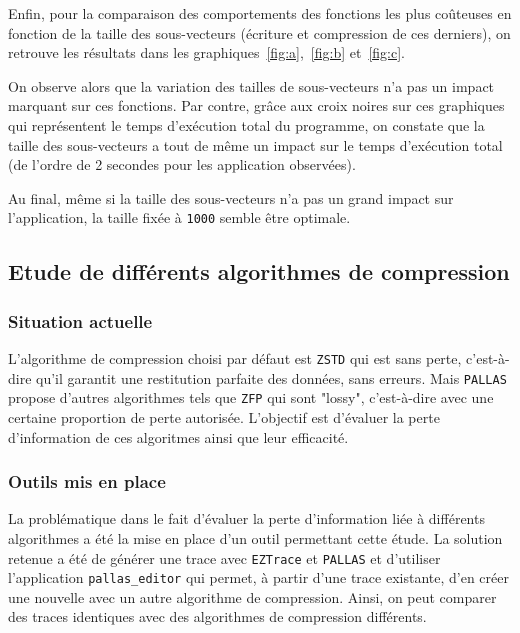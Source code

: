 Enfin, pour la comparaison des comportements des fonctions les plus coûteuses en fonction de la taille des sous-vecteurs (écriture et compression de ces derniers),
on retrouve les résultats dans les graphiques~\ref{fig:a},~\ref{fig:b} et~\ref{fig:c}.

On observe alors que la variation des tailles de sous-vecteurs n'a pas un impact marquant sur ces fonctions. Par contre, grâce aux croix noires sur ces graphiques qui représentent le temps d'exécution total du programme,
on constate que la taille des sous-vecteurs a tout de même un impact sur le temps d'exécution total (de l'ordre de 2 secondes pour les application observées).

Au final, même si la taille des sous-vecteurs n'a pas un grand impact sur l'application, la taille fixée à \verb!1000! semble être optimale.


\clearpage


\subsection{Etude de différents algorithmes de compression}\label{ssec:comp}
\subsubsection{Situation actuelle}\label{ssec:comp_situ}

L'algorithme de compression choisi par défaut est \verb!ZSTD! qui est sans perte, c'est-à-dire qu'il garantit une restitution parfaite des données, sans erreurs.
Mais \verb!PALLAS! propose d'autres algorithmes tels que \verb!ZFP! qui sont "lossy", c'est-à-dire avec une certaine proportion de perte autorisée.
L'objectif est d'évaluer la perte d'information de ces algoritmes ainsi que leur efficacité.

\subsubsection{Outils mis en place}\label{ssec:comp_tools}

La problématique dans le fait d'évaluer la perte d'information liée à différents algorithmes a été la mise en place d'un outil permettant cette étude.
La solution retenue a été de générer une trace avec \verb!EZTrace! et \verb!PALLAS! et d'utiliser l'application \verb!pallas_editor! qui permet, à partir d'une trace
existante, d'en créer une nouvelle avec un autre algorithme de compression. Ainsi, on peut comparer des traces identiques avec des algorithmes de compression différents.

